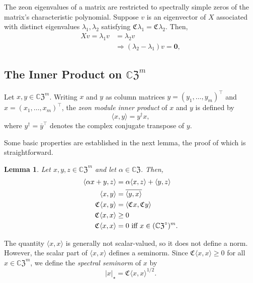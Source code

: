 \documentclass{article}
\newtheorem{lemma}[theorem]{Lemma}
\theoremstyle{definition}
\newcommand{\zco}{\mathfrak{C}\mspace{1mu}}
\newcommand{\CZ}{\mathbb{C}\mathfrak{Z}}
\newcommand{\zm}{\mathbf{0}}
\numberwithin{equation}{section}
\begin{document}
The zeon eigenvalues of a matrix are restricted to spectrally simple zeros of the matrix's characteristic polynomial.  Suppose $v$ is an eigenvector of $X$ associated with distinct eigenvalues $\lambda_1, \lambda_2$ satisfying $\zco\lambda_1=\zco\lambda_2$.  Then, 
\begin{align*}
Xv=\lambda_1v&=\lambda_2 v\\
&\Rightarrow (\lambda_2-\lambda_1)v=\zm,
\end{align*}


\subsection{The Inner Product on $\CZ^m$}\label{zeon inner product}

Let $x,y\in{\CZ}^m$.  Writing $x$ and $y$ as column matrices $y=(y_1, \ldots, y_m)^\intercal$ and \hfill\break $x=(x_1, \ldots, x_m)^\intercal$, the {\em zeon module inner product} of $x$ and $y$ is defined by
\begin{equation}\label{inner prod def}
\langle x,y\rangle = y^\dag x,
\end{equation}
where $y^\dag=\overline{y}^\intercal$ denotes the complex conjugate transpose of $y$.

Some basic properties are established in the next lemma, the proof of which is straightforward.

\begin{lemma}
Let  $x,y,z\in{\CZ}^m$ and let $\alpha\in\CZ$.  Then,
\begin{align}
\langle \alpha x+y, z\rangle &= \alpha \langle x, z\rangle+ \langle y,z\rangle\label{firstlinearity}\\  
\langle x,y\rangle &= \overline{\langle y, x\rangle}\\  
\zco \langle x,y\rangle &=\langle \zco x, \zco y\rangle\\
\zco\langle x,x\rangle &\ge 0\\
\zco\langle x,x\rangle &= 0 \text{ \rm iff }x\in({\CZ}^\circ)^m.
\end{align} 
\end{lemma}


The quantity $\langle x,x\rangle$ is generally not scalar-valued, so it does not define a norm.  However, the scalar part of $\langle x,x\rangle$ defines a seminorm.   Since $\zco \langle x,x\rangle\ge 0$ for all $x\in{\CZ}^m$, we define the {\em spectral seminorm} of $x$ by \begin{equation*}
|x|_\star=\zco\langle x, x\rangle^{1/2}.
\end{equation*}
\end{document}
